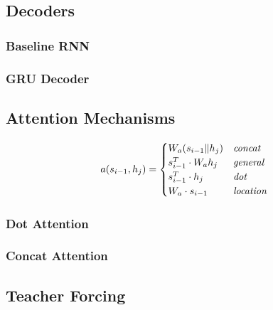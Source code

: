 \documentclass[twoside,twocolumn]{article}
\begin{document}
\subsection{Decoders}
\subsubsection{Baseline RNN}
\subsubsection{GRU Decoder}

\subsection{Attention Mechanisms}
\begin{equation}
    a(s_{i-1}, h_j) =
    \begin{cases}
        W_a (s_{i-1} \| h_j) & \text{\emph{concat}} \\
        s_{i-1}^T \cdot W_a h_j & \text{\emph{general}} \\
        s_{i-1}^T \cdot h_j & \text{\emph{dot}} \\
        W_a \cdot s_{i-1} & \text{\emph{location}}
    \end{cases}
\end{equation}
\subsubsection{Dot Attention}
\subsubsection{Concat Attention}

\subsection{Teacher Forcing}

\end{document}

